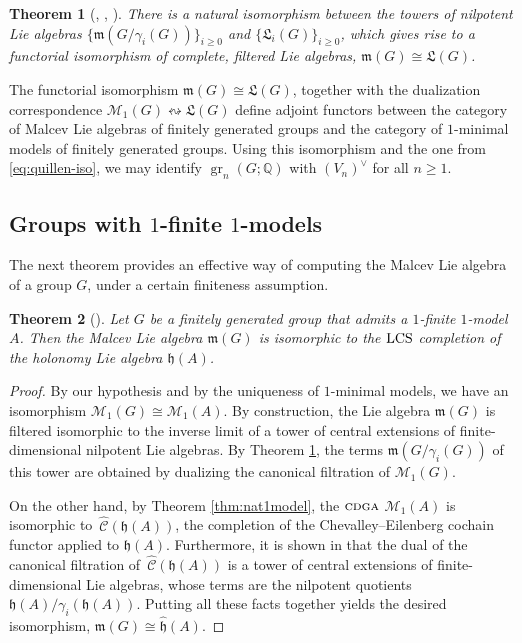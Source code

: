 \documentclass{article}
\numberwithin{equation}{section}
\newtheorem{theorem}{Theorem}[section]
\theoremstyle{definition}
\newcommand{\Q}{\mathbb{Q}}
\newcommand{\M}{\mathcal{M}}
\newcommand{\wC}{\,\widehat{\mathcal{\!C}}}
\newcommand{\h}{{\mathfrak{h}}}
\newcommand{\m}{{\mathfrak{m}}}
\newcommand{\fL}{\mathfrak{L}}
\newcommand{\cdga}{\ensuremath{\textsc{cdga}}}
\DeclareMathOperator{\gr}{gr}
\providecommand{\lcs}{\mathop{\rm LCS} \nolimits}
\begin{document}
\begin{theorem}[\cite{Sullivan77}, \cite{CP}, \cite{GM13}]
\label{thm:sullivan}
There is a natural isomorphism between the towers of nilpotent 
Lie algebras $\{\m(G/\gamma_i(G))\}_{i\ge 0}$ and $\{\fL_{i}(G)\}_{i\ge 0}$, 
which gives rise to a functorial isomorphism of complete, filtered Lie 
algebras, $\m(G)\cong \fL(G)$.
\end{theorem}  

The functorial isomorphism $\m(G) \cong \fL(G)$, together with the 
dualization correspondence $\M_1(G) \leftrightsquigarrow \fL(G)$ 
define adjoint functors between the category of Malcev Lie algebras 
of finitely generated groups and 
the category of $1$-minimal models of finitely generated groups.
Using this isomorphism and the one from \eqref{eq:quillen-iso}, 
we may identify $\gr_n(G;\Q)$ with $(V_n)^{\vee}$ for all $n\ge 1$.

\subsection{Groups with $1$-finite $1$-models}
\label{subsec:1-finite-gps}

The next theorem provides an effective way of computing the 
Malcev Lie algebra of a group $G$, under a certain finiteness assumption. 

\begin{theorem}[\cite{PS-jlms}]
\label{thm:malholo}
Let $G$ be a finitely generated group that admits a 
$1$-finite $1$-model $A$. Then the Malcev Lie algebra 
$\m (G)$ is isomorphic to the $\lcs$ completion of the holonomy Lie 
algebra $\h (A)$.
\end{theorem}
 
\begin{proof} By our hypothesis and by the uniqueness 
of $1$-minimal models, we have an isomorphism $\M_1(G)\cong \M_1(A)$. 
By construction, the Lie algebra $\m (G)$ is filtered isomorphic to the 
inverse limit of a tower of central extensions of finite-dimensional 
nilpotent Lie algebras. By Theorem \ref{thm:sullivan}, the terms 
$\m(G/\gamma_i(G))$ of this tower are obtained by dualizing the 
canonical filtration of $\M_1(G)$. 

On the other hand, by 
Theorem \ref{thm:nat1model}, the $\cdga$ $\M_1(A)$ is isomorphic 
to $\wC (\h(A))$, the completion of the Chevalley--Eilenberg cochain functor 
applied to $\h(A)$. Furthermore, it is shown in \cite[Corollary 5.7]{PS-jlms} that
the dual of the canonical filtration of $\wC (\h(A))$ is a tower of central 
extensions of finite-dimensional Lie algebras, 
whose terms are the nilpotent quotients $\h(A)/\gamma_i(\h(A))$. 
Putting all these facts together yields the desired isomorphism, 
$\m(G)\cong\widehat{\h}(A)$. 
\end{proof}
\end{document}
